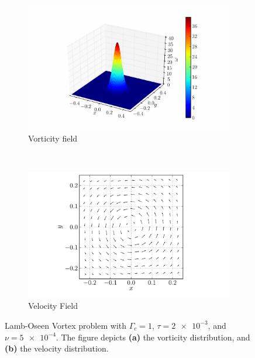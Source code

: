 	\begin{figure}[!t]
        \centering
        \begin{subfigure}[b]{0.5\textwidth}
                \includegraphics[width=\textwidth]{figures/lagrangian/lambOseen_vorticityDistribution_compressed.pdf}
                \caption{Vorticity field}
                \label{fig:lambOseen_vorticityDistribution}
        \end{subfigure}%
        ~ %
        \begin{subfigure}[b]{0.5\textwidth}
                \includegraphics[width=\textwidth]{figures/lagrangian/lambOseen_velocityDistribution_compressed.pdf}
                \caption{Velocity Field}
                \label{fig:lambOseen_velocityDistribution}
        \end{subfigure}
        \caption{Lamb-Oseen Vortex problem with $\Gamma_c = 1$, $\tau=\num{2e-3}$, and $\nu=\num{5e-4}$. The figure depicts \textbf{(a)} the vorticity distribution, and \textbf{(b)} the velocity distribution.}
        \label{fig:lambOseen_distributions}
	\end{figure}


